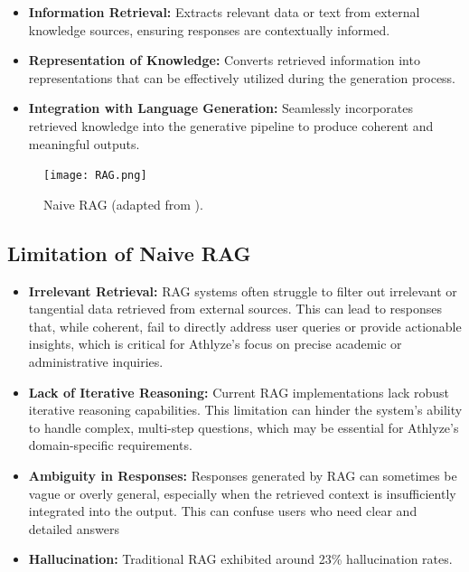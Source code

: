 \documentclass[conference]{IEEEtran}
\begin{document}
\begin{itemize}
\item \textbf{Information Retrieval:} Extracts relevant data or text from external knowledge sources, ensuring responses are contextually informed.
\item \textbf{Representation of Knowledge:} Converts retrieved information into representations that can be effectively utilized during the generation process.
\item \textbf{Integration with Language Generation:} Seamlessly incorporates retrieved knowledge into the generative pipeline to produce coherent and meaningful outputs.\\
\end{itemize}

\begin{figure}[h!]
    \centering
    \texttt{[image: RAG.png]}
    \caption{Naive RAG (adapted from \cite{12}).}
    \label{fig:RAG}
\end{figure}

\subsection{Limitation of Naive RAG}

\begin{itemize}
\item \textbf{Irrelevant Retrieval:} RAG systems often struggle to filter out irrelevant or tangential data retrieved from external sources. This can lead to responses that, while coherent, fail to directly address user queries or provide actionable insights, which is critical for Athlyze's focus on precise academic or administrative inquiries.
\item \textbf{Lack of Iterative Reasoning:} Current RAG implementations lack robust iterative reasoning capabilities. This limitation can hinder the system's ability to handle complex, multi-step questions, which may be essential for Athlyze's domain-specific requirements.
\item \textbf{Ambiguity in Responses:} Responses generated by RAG can sometimes be vague or overly general, especially when the retrieved context is insufficiently integrated into the output. This can confuse users who need clear and detailed answers
\item \textbf{Hallucination:} Traditional RAG exhibited around 23\% hallucination rates.\\

\end{itemize}
\end{document}
